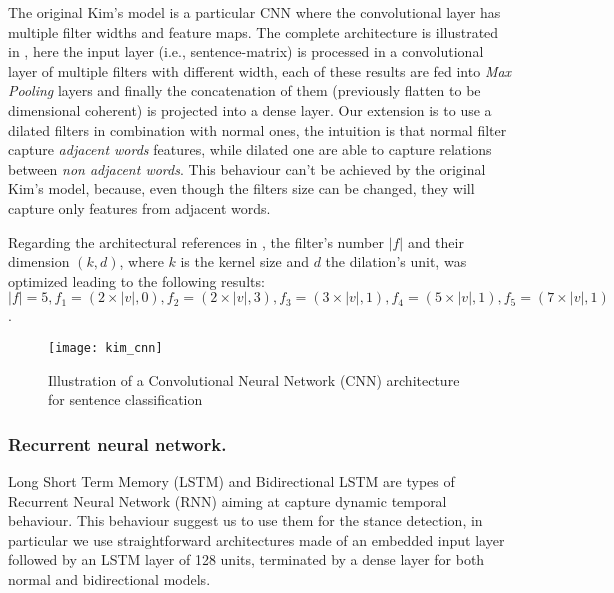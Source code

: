 The original Kim's model is a particular CNN where the convolutional layer has multiple filter widths and feature maps.
The complete architecture is illustrated in , here the input layer (i.e., sentence-matrix) is processed in a convolutional layer of multiple filters with different width, each of these results are fed into \emph{Max Pooling} layers and finally the concatenation of them (previously flatten to be dimensional coherent) is projected into a dense layer.
Our extension is to use a dilated filters in combination with normal ones, the intuition is that normal filter capture \emph{adjacent words} features, while dilated one are able to capture relations between \emph{non adjacent words}.
This behaviour can't be achieved by the original Kim's model, because, even though the filters size can be changed, they will capture only features from adjacent words.

Regarding the architectural references in \cite{kim2014convolutional}, the filter's number $|f|$ and their dimension $(k,d)$, where $k$ is the kernel size and $d$ the dilation's unit, was optimized leading to the following results: $|f| = 5, f_1 = (2\times|v|,0), f_2 = (2\times|v|,3), f_3 = (3\times|v|,1), f_4 = (5\times|v|,1), f_5 = (7\times|v|,1)$.

\begin{figure}[h]
\footnotesize
\centering
\texttt{[image: kim\_cnn]}
\caption{\cite{zhang2015sensitivity} Illustration of a Convolutional Neural Network (CNN) architecture for sentence classification}
\label{fig:kim}
\end{figure}


\subsubsection{Recurrent neural network.}
Long Short Term Memory (LSTM) and Bidirectional LSTM are types of Recurrent Neural Network (RNN) aiming at capture dynamic temporal behaviour.
This behaviour suggest us to use them for the stance detection, in particular we use straightforward architectures made of an embedded input layer followed by an LSTM layer of 128 units, terminated by a dense layer for both normal and bidirectional models.